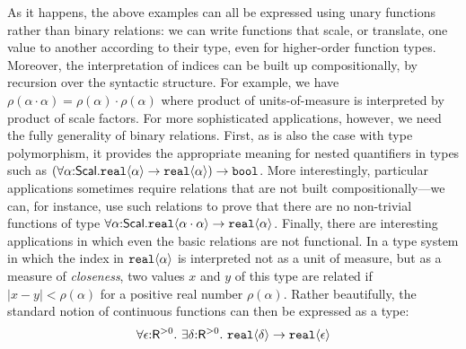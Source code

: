 \vspace*{0.1in}

As it happens, the above examples can all be expressed using unary
functions rather than binary relations: we can write functions that
scale, or translate, one value to another according to their type,
even for higher-order function types. Moreover, the interpretation of
indices can be built up compositionally, by recursion over the
syntactic structure. For example, we have $\rho(\alpha\cdot\alpha) =
\rho(\alpha)\cdot\rho(\alpha)$ where product of units-of-measure is
interpreted by product of scale factors. For more sophisticated
applications, however, we need the fully generality of binary
relations. First, as is also the case with type polymorphism, it
provides the appropriate meaning for nested quantifiers in types such
as
$(\forall\alpha\mathord:\mathsf{Scal}.\textup{\texttt{real}}\langle \alpha \rangle\to\textup{\texttt{real}}\langle \alpha \rangle)\to\texttt{bool}$.
More interestingly, particular applications sometimes require
relations that are not built compositionally---we can, for instance,
use such relations to prove that there are no non-trivial functions of
type
$\forall\alpha\mathord:\mathsf{Scal}.\textup{\texttt{real}}\langle \alpha\cdot\alpha \rangle\to\textup{\texttt{real}}\langle \alpha \rangle$.
Finally, there are interesting applications in which even the basic
relations are not functional. In a type system in which the index in
$\textup{\texttt{real}}\langle \alpha \rangle$ is interpreted not as a unit of measure, but as
a measure of \emph{closeness}, two values $x$ and $y$ of this type are
related if $|x-y| < \rho(\alpha)$ for a positive real number
$\rho(\alpha)$.  Rather beautifully, the standard notion of continuous
functions can then be expressed as a type:
\begin{displaymath}
  \forall \epsilon \mathord: \mathsf{R}^{>0}.\ \exists \delta\mathord: \mathsf{R}^{>0}.\ \textup{\texttt{real}}\langle \delta \rangle \to \textup{\texttt{real}}\langle \epsilon \rangle
\end{displaymath}



